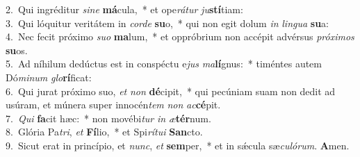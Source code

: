 {2.~}Qui ingréditur \textit{si}\textit{ne} \textbf{má}cula,~* et ope\textit{rá}\textit{tur} \textit{ju}\textbf{stí}tiam:\\
{3.~}Qui lóquitur veritátem in \textit{cor}\textit{de} \textbf{su}o,~* qui non egit dolum \textit{in} \textit{lin}\textit{gua} \textbf{su}a:\\
{4.~}Nec fecit próximo \textit{su}\textit{o} \textbf{ma}lum,~* et oppróbrium non accépit advérsus \textit{pró}\textit{xi}\textit{mos} \textbf{su}os.\\
{5.~}Ad níhilum dedúctus est in conspéctu e\textit{jus} \textit{ma}\textbf{lí}gnus:~* timéntes autem Dó\textit{mi}\textit{num} \textit{glo}\textbf{rí}ficat:\\
{6.~}Qui jurat próximo suo, \textit{et} \textit{non} \textbf{dé}cipit,~* qui pecúniam suam non dedit ad usúram, et múnera super innocén\textit{tem} \textit{non} \textit{ac}\textbf{cé}pit.\\
{7.~}\textit{Qui} \textbf{fa}cit hæc:~* non movébi\textit{tur} \textit{in} \textit{æ}\textbf{tér}num.\\
{8.~}Glória Pa\textit{tri}, \textit{et} \textbf{Fí}lio,~* et Spi\textit{rí}\textit{tu}\textit{i} \textbf{San}cto.\\
{9.~}Sicut erat in princípio, et \textit{nunc}, \textit{et} \textbf{sem}per,~* et in sǽcula sæ\textit{cu}\textit{ló}\textit{rum}. \textbf{A}men.\\
